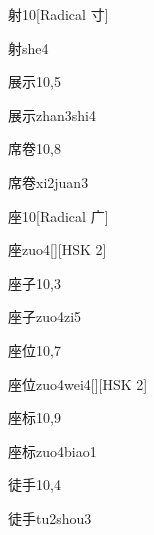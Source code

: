 \begin{entry}{射}{10}[Radical 寸]
  \begin{phonetics}{射}{she4}
  \end{phonetics}
\end{entry}

\begin{entry}{展示}{10,5}
  \begin{phonetics}{展示}{zhan3shi4}
  \end{phonetics}
\end{entry}

\begin{entry}{席卷}{10,8}
  \begin{phonetics}{席卷}{xi2juan3}
  \end{phonetics}
\end{entry}

\begin{entry}{座}{10}[Radical 广]
  \begin{phonetics}{座}{zuo4}[][HSK 2]
  \end{phonetics}
\end{entry}

\begin{entry}{座子}{10,3}
  \begin{phonetics}{座子}{zuo4zi5}
  \end{phonetics}
\end{entry}

\begin{entry}{座位}{10,7}
  \begin{phonetics}{座位}{zuo4wei4}[][HSK 2]
  \end{phonetics}
\end{entry}

\begin{entry}{座标}{10,9}
  \begin{phonetics}{座标}{zuo4biao1}
  \end{phonetics}
\end{entry}

\begin{entry}{徒手}{10,4}
  \begin{phonetics}{徒手}{tu2shou3}
  \end{phonetics}
\end{entry}

